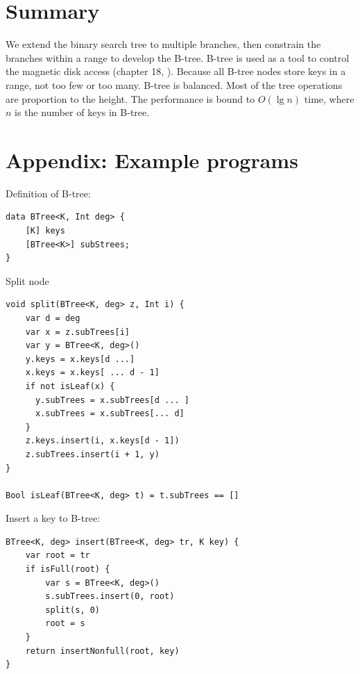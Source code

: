 \documentclass[b5paper]{article}
\begin{document}
\begin{Exercise}
\end{Exercise}

\section{Summary}
We extend the binary search tree to multiple branches, then constrain the branches within a range to develop the B-tree. B-tree is used as a tool to control the magnetic disk access (chapter 18, \cite{CLRS}). Because all B-tree nodes store keys in a range, not too few or too many. B-tree is balanced. Most of the tree operations are proportion to the height. The performance is bound to $O(\lg n)$ time, where $n$ is the number of keys in B-tree.

\section{Appendix: Example programs}

Definition of B-tree:

\begin{lstlisting}[language = Bourbaki]
data BTree<K, Int deg> {
    [K] keys
    [BTree<K>] subStrees;
}
\end{lstlisting}

Split node

\begin{lstlisting}[language = Bourbaki]
void split(BTree<K, deg> z, Int i) {
    var d = deg
    var x = z.subTrees[i]
    var y = BTree<K, deg>()
    y.keys = x.keys[d ...]
    x.keys = x.keys[ ... d - 1]
    if not isLeaf(x) {
      y.subTrees = x.subTrees[d ... ]
      x.subTrees = x.subTrees[... d]
    }
    z.keys.insert(i, x.keys[d - 1])
    z.subTrees.insert(i + 1, y)
}

Bool isLeaf(BTree<K, deg> t) = t.subTrees == []
\end{lstlisting}

Insert a key to B-tree:

\begin{lstlisting}[language = Bourbaki]
BTree<K, deg> insert(BTree<K, deg> tr, K key) {
    var root = tr
    if isFull(root) {
        var s = BTree<K, deg>()
        s.subTrees.insert(0, root)
        split(s, 0)
        root = s
    }
    return insertNonfull(root, key)
}
\end{lstlisting}
\end{document}
